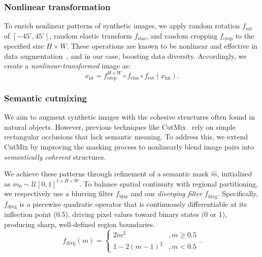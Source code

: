 \subsubsection{Nonlinear transformation} \label{sssec:03-framework-synthesis-nonlintrans}
\begin{foldable} %
  To enrich nonlinear patterns of synthetic images, we apply random rotation $f_\text{rot}$ of $[-45^{\circ}, 45^{\circ}]$, random elastic transform $f_\text{elas}$, and random cropping $f_\text{crop}$ to the specified size $H \times W$.
  These operations are known to be nonlinear and effective in data augmentation~\cite{simard2003best}, and in our case, boosting data diversity.
  Accordingly, we create a \textit{nonlinear-transformed} image as:
  \begin{equation} \label{eq:synthesis-nonlintrans}
    x_\text{nt} = f_\text{crop}^{H\times W} \circ f_\text{elas} \circ f_\text{rot} (x_\text{hn}).
  \end{equation}
\end{foldable}

\subsubsection{Semantic cutmixing} \label{sssec:03-framework-synthesis-semcutmix}
\begin{foldable} %
  We aim to augment synthetic images with the cohesive structures often found in natural objects.
  However, previous techniques like CutMix~\cite{yun2019cutmix} rely on simple rectangular occlusions that lack semantic meaning.
  To address this, we extend CutMix by improving the masking process to nonlinearly blend image pairs into \textit{semantically coherent} structures.
\end{foldable}

\begin{foldable} %
  We achieve these patterns through refinement of a semantic mask $\hat{m}$, initialized as $m_{0} \sim \mathcal{U}[0,1]^{1 \times H \times W}$.
  To balance spatial continuity with regional partitioning, we respectively use a blurring filter $f_\text{blur}$ and our \textit{diverging filter} $f_\text{divg}$.
  Specifically, $f_\text{divg}$ is a piecewise quadratic operator that is continuously differentiable at its inflection point (0.5), driving pixel values toward binary states (0 or 1), producing sharp, well-defined region boundaries.
  \begin{equation} \label{eq:synthesis-diverging-filter}
    f_\text{divg}(m) =
    \begin{cases}
      2 m^2           & , m \ge 0.5 \\
      1 - 2 (m - 1)^2 & , m < 0.5
    \end{cases}.
  \end{equation}
\end{foldable}

